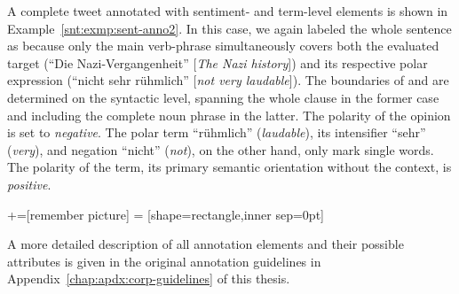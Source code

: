 A complete tweet annotated with sentiment- and term-level elements is
shown in Example~\ref{snt:exmp:sent-anno2}. In this case, we again
labeled the whole sentence as  because only the
main verb-phrase simultaneously covers both the evaluated target
(``Die Nazi-Vergangenheit'' [\emph{The Nazi history}]) and its
respective polar expression (``nicht sehr r\"uhmlich'' [\emph{not very
    laudable}]).  The boundaries of  and
 are determined on the syntactic level, spanning the
whole clause in the former case and including the complete noun phrase
in the latter.  The polarity of the opinion is set to \emph{negative}.
The polar term ``r\"uhmlich'' (\emph{laudable}), its intensifier
``sehr'' (\emph{very}), and negation ``nicht'' (\emph{not}), on the
other hand, only mark single words.  The polarity of the term, \ie{}
its primary semantic orientation without the context, is
\emph{positive}.
\begin{example}\label{snt:exmp:sent-anno2}
  +=[remember picture]
   = [shape=rectangle,inner sep=0pt]
  \upshape{}\\[2.2em]
  \noindent{}

\end{example}
A more detailed description of all annotation elements and their
possible attributes is given in the original annotation guidelines in
Appendix~\ref{chap:apdx:corp-guidelines} of this thesis.

